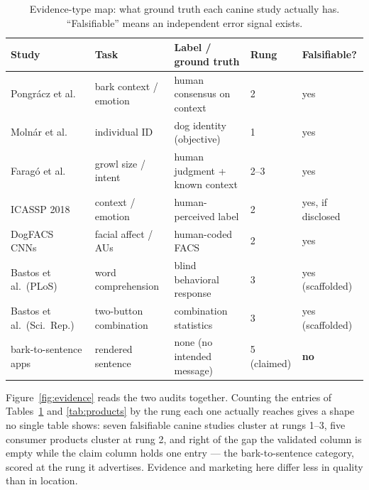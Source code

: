 \begin{table}[htbp]
\centering
\caption{Evidence-type map: what ground truth each canine study actually
has. ``Falsifiable'' means an independent error signal exists.}
\label{tab:evidence}
\footnotesize
\setlength{\tabcolsep}{4pt}
\begin{tabular}{@{}p{3.0cm}p{3.4cm}p{3.3cm}p{1.7cm}p{2.2cm}@{}}
\toprule
\textbf{Study} & \textbf{Task} & \textbf{Label / ground truth} & \textbf{Rung} & \textbf{Falsifiable?} \\
\midrule
Pongr\'acz et al.~\cite{pongracz2005barks,pongracz2006acoustic} & bark context / emotion & human consensus on context & 2 & yes \\
Moln\'ar et al.~\cite{molnar2006discriminate} & individual ID & dog identity (objective) & 1 & yes \\
Farag\'o et al.~\cite{farago2017growls} & growl size / intent & human judgment + known context & 2--3 & yes \\
ICASSP 2018~\cite{icassp2018dogbark} & context / emotion & human-perceived label & 2 & yes, if disclosed \\
DogFACS CNNs~\cite{sci2022explainable,sci2023cnnewoa,sci2025automated} & facial affect / AUs & human-coded FACS & 2 & yes \\
Bastos et al.\ (PLoS)~\cite{bastos2024plos} & word comprehension & blind behavioral response & 3 & yes (scaffolded) \\
Bastos et al.\ (Sci.\ Rep.)~\cite{bastos2024scirep} & two-button combination & combination statistics & 3 & yes (scaffolded) \\
bark-to-sentence apps~\cite{traini2024} & rendered sentence & none (no intended message) & 5 (claimed) & \textbf{no} \\
\bottomrule
\end{tabular}
\end{table}

Figure~\ref{fig:evidence} reads the two audits together. Counting the entries
of Tables~\ref{tab:evidence} and \ref{tab:products} by the rung each one
actually reaches gives a shape no single table shows: seven falsifiable
canine studies cluster at rungs 1--3, five consumer products cluster at
rung 2, and right of the gap the validated column is empty while the claim
column holds one entry --- the bark-to-sentence category, scored at the rung
it advertises. Evidence and marketing here differ less in quality than in
location.

